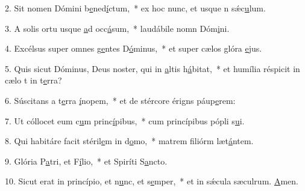 2. Sit nomen Dómini b\uline{e}ned\uline{í}ctum,~* ex hoc nunc, et usque n sǽc\uline{u}lum.\par 
3. A solis ortu usque \uline{a}d occ\uline{á}sum,~* laudábile nomn Dóm\uline{i}ni.\par 
4. Excélsus super omnes g\uline{e}ntes D\uline{ó}minus,~* et super cælos glóra \uline{e}jus.\par 
5. Quis sicut Dóminus, Deus noster, qui in \uline{a}ltis h\uline{á}bitat,~* et humília réspicit in cælo t in t\uline{e}rra?\par 
6. Súscitans a t\uline{e}rra \uline{í}nopem,~* et de stércore érigns páup\uline{e}rem:\par 
7. Ut cóllocet eum c\uline{u}m princ\uline{í}pibus,~* cum princípibus pópli s\uline{u}i.\par 
8. Qui habitáre facit stéril\uline{e}m in d\uline{o}mo,~* matrem filiórm læt\uline{á}ntem.\par 
9. Glória P\uline{a}tri, et F\uline{í}lio,~* et Spiríti S\uline{a}ncto.\par 
10. Sicut erat in princípio, et n\uline{u}nc, et s\uline{e}mper,~* et in sǽcula sæculrum. \uline{A}men.\par 
